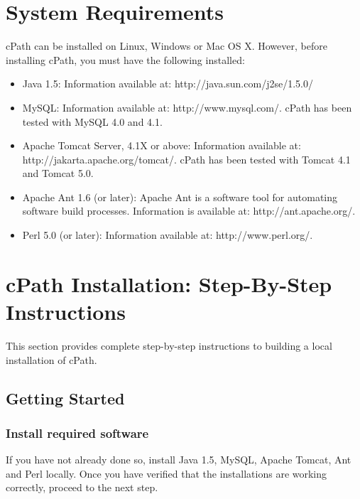 \documentclass[letterpaper,12pt]{article}
\begin{document}
\section{System Requirements}

cPath can be installed on Linux, Windows or Mac OS X.  However, before installing cPath, you must have the following installed: 

\begin{itemize}

\item Java 1.5:  Information available at:  http://java.sun.com/j2se/1.5.0/

\item MySQL: Information available at: http://www.mysql.com/.  cPath has been 
tested with MySQL 4.0 and 4.1. 

\item Apache Tomcat Server, 4.1X or above: Information available at: \linebreak
http://jakarta.apache.org/tomcat/.  cPath has been tested with Tomcat 4.1 
and Tomcat 5.0. 
 
\item Apache Ant 1.6 (or later): Apache Ant is a software tool for automating software build processes.  Information is available at: http://ant.apache.org/. 
 
\item Perl 5.0 (or later): Information available at: http://www.perl.org/. 

\end {itemize}

\section{cPath Installation:  Step-By-Step Instructions }

This section provides complete step-by-step instructions to building a local installation of cPath.

\subsection{Getting Started}

\subsubsection{Install required software}

If you have not already done so, install Java 1.5, MySQL, Apache Tomcat, Ant and Perl locally. Once you have verified that the installations are working correctly, proceed to the next step. 
\end{document}
